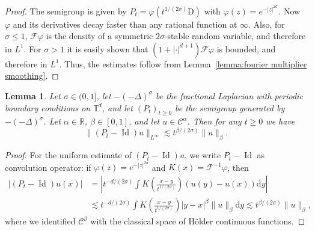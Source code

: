 \documentclass[11pt,a4paper]{article}
\newcommand{\mathD}{\mathrm{D}}
\newcommand{\mathd}{\mathrm{d}}
\newcommand{\nosymbol}{}
\newcommand{\tmop}[1]{\ensuremath{\operatorname{#1}}}
\newtheorem{lemma}[theorem]{Lemma}
\theoremstyle{remark}
\newtheorem{remark}[theorem]{Remark}
\newcommand{\CC}{\ensuremath{\mathscr{C}}}
\newcommand{\CF}{\ensuremath{\mathscr{F}}}
\begin{document}
\begin{proof}
  The semigroup is given by $P_{t} = \varphi ( t^{1/ ( 2 \sigma )} \mathD )$ with $\varphi ( z ) =e^{- | z |^{2 \sigma}}$. Now $\varphi$ and its derivatives decay faster than any rational function at $\infty$. Also, for $\sigma \le 1$, $\CF \varphi$ is the density of a symmetric $2 \sigma$-stable random variable, and therefore in $L^{1}$. For $\sigma > 1$ it is easily shown that $(1+|\cdot|^{d+1}) \CF \varphi$ is bounded, and therefore in $L^1$. Thus, the estimates follow from Lemma~\ref{lemma:fourier multiplier smoothing}.
\end{proof}



\begin{lemma}\label{lemma:semigroup hoelder in time}
   Let $\sigma \in ( 0,1 ]$, let $- ( -\Delta )^{\sigma}$ be the fractional Laplacian with periodic boundary conditions on $\mathbb{T}^{d} \nosymbol$, and let $( P_{t} )_{t \geqslant 0}$ be the semigroup generated by $- ( - \Delta )^{\sigma}$. Let $\alpha \in \mathbb{R}$, $\beta \in [ 0,1 ]$, and let $u \in \CC^{\alpha}$. Then for any $t \geqslant 0$ we have
  \[
     \| ( P_{t} - \tmop{Id} ) u \|_{L^{\infty}} \lesssim t^{\beta / ( 2 \sigma )} \| u \|_{\beta}.
  \]
\end{lemma}

\begin{proof}
  For the uniform estimate of $( P_{t} - \tmop{Id} ) u$, we write $P_{t} - \tmop{Id}$ as convolution operator: if $\varphi ( z ) =e^{- | z |^{2\sigma}}$ and $K ( x ) =\mathcal{F}^{-1} \varphi$, then
  \begin{align*}
     | ( P_{t} - \tmop{Id} ) u ( x ) | & = \left| t^{-d/ ( 2 \sigma )} \int K \left( \frac{x-y}{t^{1/ ( 2 \sigma )}} \right) ( u ( y ) -u ( x ) ) \mathd y \right| \\
     & \lesssim t^{-d/ ( 2 \sigma )} \int K \left( \frac{x-y}{t^{1/ ( 2 \sigma )}} \right) | y-x |^{\beta} \| u \|_{\beta} \mathd y \lesssim t^{\beta / ( 2 \sigma )} \| u \|_{\beta},
  \end{align*}
  where we identified $\CC^{\beta}$ with the classical space of H{\"o}lder continuous functions.
\end{proof}
\end{document}
